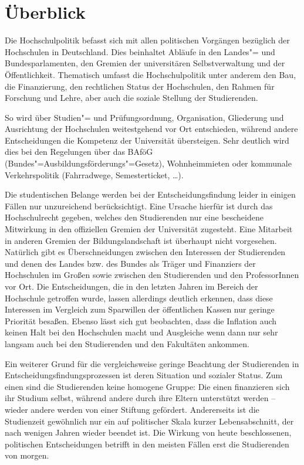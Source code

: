 \section{Überblick}
\label{hopo}

Die Hochschulpolitik befasst sich mit allen politischen Vorgängen bezüglich der Hochschulen in Deutschland. Dies beinhaltet Abläufe in den Landes"= und Bundesparlamenten, den Gremien der universitären Selbstverwaltung und der Öffentlichkeit. Thematisch umfasst die Hochschulpolitik unter anderem den Bau, die Finanzierung, den rechtlichen Status der Hochschulen, den Rahmen für Forschung und Lehre, aber auch die soziale Stellung der Studierenden.

So wird über Studien"= und Prüfungsordnung, Organisation, Gliederung und Ausrichtung der Hochschulen weitestgehend vor Ort entschieden, während andere Entscheidungen die Kompetenz der Universität übersteigen. Sehr deutlich wird dies bei den Regelungen über das BAföG (Bundes"=Ausbildungsförderungs"=Gesetz), Wohnheimmieten oder kommunale Verkehrspolitik (Fahrradwege, Semesterticket,
\dots).

Die studentischen Belange werden bei der Entscheidungsfindung leider in einigen Fällen nur unzureichend berücksichtigt. Eine Ursache hierfür ist durch das Hochschulrecht gegeben, welches den Studierenden nur eine bescheidene Mitwirkung in den offiziellen Gremien der Universität zugesteht. Eine Mitarbeit in anderen Gremien der Bildungslandschaft ist überhaupt nicht vorgesehen. Natürlich gibt es Überschneidungen zwischen den Interessen der Studierenden und denen des Landes bzw. des Bundes als Träger und Finanziers der Hochschulen im Großen sowie zwischen den Studierenden und den ProfessorInnen vor Ort. Die Entscheidungen, die in den letzten Jahren im Bereich der Hochschule getroffen wurde, lassen allerdings deutlich erkennen, dass diese Interessen im Vergleich zum Sparwillen der öffentlichen Kassen nur geringe Priorität besaßen. Ebenso lässt sich gut beobachten, dass die Inflation auch keinen Halt bei den Hochschulen macht und Ausgleiche wenn dann nur sehr langsam auch bei den Studierenden und den Fakultäten ankommen.

Ein weiterer Grund für die vergleichsweise geringe Beachtung der Studierenden in Entscheidungsfindungsprozessen ist deren Situation und sozialer Status. Zum einen sind die Studierenden keine homogene Gruppe: Die einen finanzieren sich ihr Studium selbst, während andere durch ihre Eltern unterstützt werden -- wieder andere werden von einer Stiftung gefördert. Andererseits ist die Studienzeit gewöhnlich nur ein auf politischer Skala kurzer Lebensabschnitt, der nach wenigen Jahren wieder beendet ist. Die Wirkung von heute beschlossenen, politischen Entscheidungen betrifft in den meisten Fällen erst die Studierenden von morgen.

